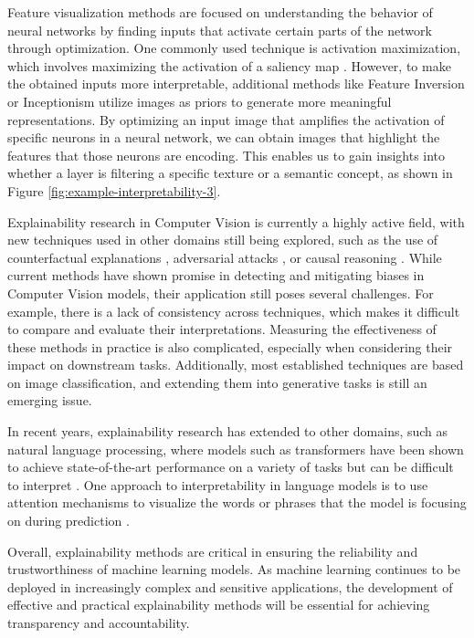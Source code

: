 Feature visualization methods are focused on understanding the behavior of neural networks by finding inputs that activate certain parts of the network through optimization. One commonly used technique is activation maximization, which involves maximizing the activation of a saliency map \cite{Simonyan2013DeepIC}. However, to make the obtained inputs more interpretable, additional methods like Feature Inversion \cite{featureInversion} or Inceptionism \cite{Mordvintsev2015InceptionismGD} utilize images as priors to generate more meaningful representations. By optimizing an input image that amplifies the activation of specific neurons in a neural network, we can obtain images that highlight the features that those neurons are encoding. This enables us to gain insights into whether a layer is filtering a specific texture or a semantic concept, as shown in Figure \ref{fig:example-interpretability-3}.

Explainability research in Computer Vision is currently a highly active field, with new techniques used in other domains still being explored, such as the use of counterfactual explanations \cite{conterfactual2019}, adversarial attacks \cite{Ghorbani_Abid_Zou_2019}, or causal reasoning \cite{Liu2022CausalRM}. While current methods have shown promise in detecting and mitigating biases in Computer Vision models, their application still poses several challenges. For example, there is a lack of consistency across techniques, which makes it difficult to compare and evaluate their interpretations. Measuring the effectiveness of these methods in practice is also complicated, especially when considering their impact on downstream tasks. Additionally, most established techniques are based on image classification, and extending them into generative tasks is still an emerging issue.

In recent years, explainability research has extended to other domains, such as natural language processing, where models such as transformers have been shown to achieve state-of-the-art performance on a variety of tasks but can be difficult to interpret \cite{attentionisnot,clark-etal-2019-bert}. One approach to interpretability in language models is to use attention mechanisms to visualize the words or phrases that the model is focusing on during prediction \cite{attentionisnot}. 

Overall, explainability methods are critical in ensuring the reliability and trustworthiness of machine learning models. As machine learning continues to be deployed in increasingly complex and sensitive applications, the development of effective and practical explainability methods will be essential for achieving transparency and accountability.


